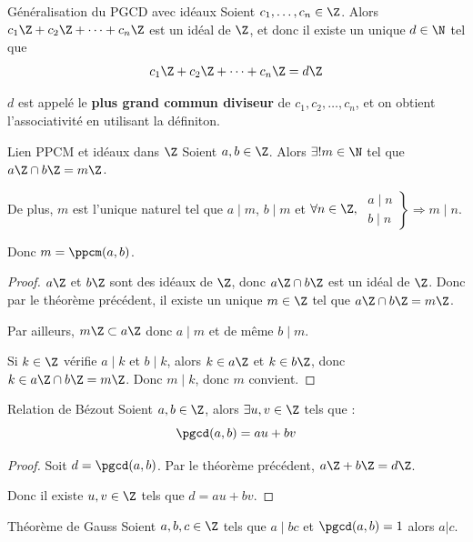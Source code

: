\begin{proposition}{Généralisation du PGCD avec idéaux}{}
    Soient $c_1, \ldots, c_n \in \Z$. Alors $c_1 \Z + c_2 \Z + \cdots + c_n \Z$ est un 
    idéal de $\Z$, et donc il existe un unique $d \in \N$ tel que 
    \[c_1 \Z + c_2 \Z + \cdots + c_n \Z = d \Z\]

    $d$ est appelé le \textbf{plus grand commun diviseur} de $c_1, c_2, \ldots, c_n$, et 
    on obtient l'associativité en utilisant la définiton. 
\end{proposition}

\begin{theoreme}{Lien PPCM et idéaux dans $\Z$}{}
    Soient $a, b \in \Z$. Alors $\exists ! m \in \N$ tel que $a \Z \cap b \Z = m \Z$.

    De plus, $m$ est l'unique naturel tel que $a \mid m$, $b \mid m$ et 
    $\forall n \in \Z,$
    $\left. \begin{aligned}
        a \mid n \\
        b \mid n    
    \end{aligned} \right\} \Rightarrow m \mid n$.

    Donc $m = \ppcm(a, b)$.
\end{theoreme}

\begin{proof}
    $a \Z$ et $b \Z$ sont des idéaux de $\Z$, donc $a \Z \cap b \Z$ est un idéal de $\Z$. 
    Donc par le théorème précédent, il existe un unique $m \in \Z$ tel que $a \Z \cap b \Z = m \Z$.

    Par ailleurs, $m \Z \subset a \Z$ donc $a \mid m$ et de même $b \mid m$.

    Si $k \in \Z$ vérifie $a \mid k$ et $b \mid k$, alors $k \in a \Z$ et $k \in b \Z$, donc
    $k \in a \Z \cap b \Z = m \Z$. Donc $m \mid k$, donc $m$ convient.
\end{proof}

\begin{proposition}{Relation de Bézout}{}
    Soient $a, b \in \Z$, alors $\exists u, v \in \Z$ tels que : 
    \[\pgcd(a, b) = au + bv\]
\end{proposition}

\begin{proof}
    Soit $d = \pgcd(a, b)$. Par le théorème précédent, $a \Z + b \Z = d \Z$.

    Donc il existe $u, v \in \Z$ tels que $d = au + bv$.
\end{proof}

\begin{proposition}{Théorème de Gauss}{}
    Soient $a,b,c \in \Z$ tels que $a \mid bc$ et $\pgcd(a,b) = 1$ alors $a | c$.        
\end{proposition}


